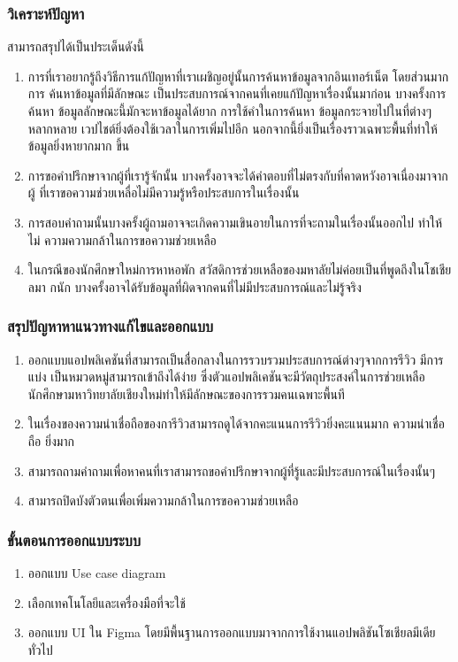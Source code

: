 \subsubsection{วิเคราะห์ปัญหา}
สามารถสรุปได้เป็นประเด็นดังนี้
\begin{enumerate}
  \item การที่เราอยากรู้ถึงวิธีการแก้ปัญหาที่เราเผชิญอยู่นั้นการค้นหาข้อมูลจากอินเทอร์เน็ต โดยส่วนมากการ
  ค้นหาข้อมูลที่มีลักษณะ เป็นประสบการณ์จากคนที่เคยแก้ปัญหาเรื่องนั้นมาก่อน บางครั้งการค้นหา
  ข้อมูลลักษณะนี้มักจะหาข้อมูลได้ยาก การใช้คําในการค้นหา ข้อมูลกระจายไปในที่ต่างๆหลากหลาย
  เวปไชต์ยิ่งต้องใช้เวลาในการเพิ่มไปอีก นอกจากนี้ยิ่งเป็นเรื่องราวเฉพาะพื้นที่ทําให้ข้อมูลยิ่งหายากมาก
  ขึ้น
  \item การขอคําปรึกษาจากผู้ที่เรารู้จักนั้น บางครั้งอาจจะได้คําตอบที่ไม่ตรงกับที่คาดหวังอาจเนื่องมาจากผู้
  ที่เราขอความช่วยเหลื่อไม่มีความรู้หรือประสบการในเรื่องนั้น
  
  \item การสอบคําถามนั้นบางครั้งผู้ถามอาจจะเกิดความเขินอายในการที่จะถามในเรื่องนั้นออกไป ทําให้ไม่
  ความความกล้าในการขอความช่วยเหลือ
  
  \item ในกรณีของนักศึกษาใหม่การหาหอพัก สวัสดิการช่วยเหลือของมหาลัยไม่ค่อยเป็นที่พูดถึงในโชเชียลมา
  กนัก บางครั้งอาจได้รับข้อมูลที่ผิดจากคนที่ไม่มีประสบการณ์และไม่รู้จริง
\end{enumerate}

\subsubsection{สรุปปัญหาหาแนวทางแก้ไขและออกแบบ}
\begin{enumerate}
  \item ออกแบบแอปพลิเคชันที่สามารถเป็นสื่อกลางในการรวบรวมประสบการณ์ต่างๆจากการรีวิว มีการแบ่ง
  เป็นหมวดหมู่สามารถเข้าถึงได้ง่าย ซึ่งตัวแอปพลิเคชันจะมีวัตถุประสงค์ในการช่วยเหลือนักศึกษามหาวิทยาลัยเชียงใหม่ทําให้มีลักษณะของการรวมคนเฉพาะพื้นที
  
  \item ในเรื่องของความน่าเชื่อถือของการีวิวสามารถดูได้จากคะแนนการรีวิวยิ่งคะแนนมาก ความน่าเชื่อถือ
  ยิ่งมาก
  \item สามารถถามคําถามเพื่อหาคนที่เราสามารถขอคําปรึกษาจากผู้ที่รู้และมีประสบการณ์ในเรื่องนั้นๆ
  \item สามารถปิดบังตัวตนเพื่อเพิ่มความกล้าในการขอความช่วยเหลือ
\end{enumerate}

\subsubsection{ขั้นตอนการออกแบบระบบ}
\begin{enumerate}
  \item ออกแบบ Use case diagram
  \item เลือกเทคโนโลยีและเครื่องมือที่จะใช้
  
  \item  ออกแบบ UI ใน Figma โดยมีพื้นฐานการออกแบบมาจากการใช้งานแอปพลิชันโซเชียลมีเดียทั่วไป
  
\end{enumerate}
